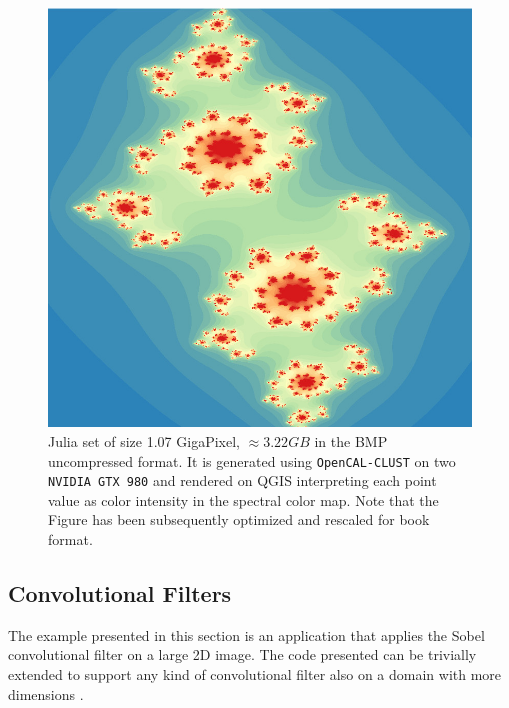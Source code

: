  \begin{figure}[H]
    \begin{center}
        \includegraphics[scale=0.35]{./images/opencal/fractal16k16k}
        \caption[Julia set of size 1.07 GigaPixel generated using \texttt{OpenCAL-CLUST}.]{Julia set of size 1.07 GigaPixel, $\approx 3.22 GB$ in the BMP uncompressed format. It is generated using \texttt{OpenCAL-CLUST} on two \texttt{NVIDIA GTX 980} and rendered on QGIS \cite{QGIS_software} interpreting each point value as color intensity in the spectral color map. Note that the Figure has been subsequently optimized and rescaled for book format.}
        \label{fig:fractal16k16k}
    \end{center}
\end{figure}

\subsection{Convolutional Filters}
\label{sec:convolutional_filters}
The example presented in this section is an application that applies the Sobel convolutional filter \cite{Shapiro:2002,Hadwiger:2006} on a large 2D image. The code presented can be trivially extended to support any kind of convolutional filter also on a domain with more dimensions .


